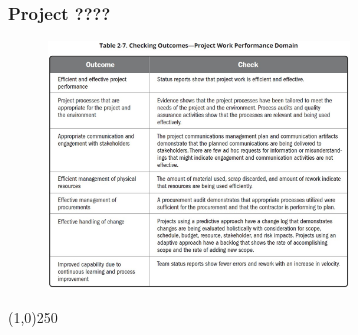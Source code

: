 \begin{frame}
\frametitle{Project ????}
 \begin{figure}
    \centering
        \includegraphics[width = 8cm]{../images/guide/Table2-7.jpg}
    \label{guideTable:2-7}
 \end{figure}
\end{frame}
\begin{center}\line(1,0){250}\end{center}



